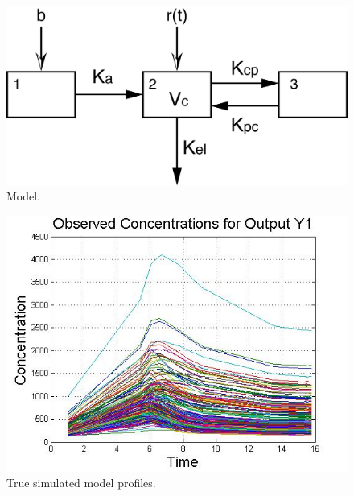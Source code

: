 
%
%
\begin{figure}[hbtp]
\centering
\includegraphics[scale=0.45]{figModel.png}
\caption{Model.
}
\label{Fig:Model}
\end{figure}


%
%
\begin{figure}[ht]
     \centering
        \includegraphics[width=0.65\linewidth]{figRunBigObservedConcentrations.jpg}
        \caption{True simulated model profiles.}
        \label{Fig:Spaghetti}
\end{figure}

